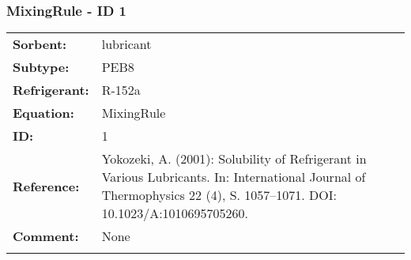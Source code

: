 \FloatBarrier
\newpage
\subsubsection{MixingRule - ID 1}
%
\begin{tabular}[l]{|lp{11.5cm}|}
\hline
\addlinespace

\textbf{Sorbent:} & lubricant \\
\textbf{Subtype:} & PEB8 \\
\textbf{Refrigerant:} & R-152a \\
\textbf{Equation:} & MixingRule \\
\textbf{ID:} & 1 \\
\textbf{Reference:} & Yokozeki, A. (2001): Solubility of Refrigerant in Various Lubricants. In: International Journal of Thermophysics 22 (4), S. 1057–1071. DOI: 10.1023/A:1010695705260. \\
\textbf{Comment:} & None \\

\addlinespace
\hline
\end{tabular}
\newline

